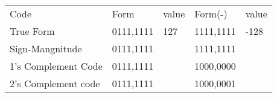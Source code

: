 \documentclass[en, 11pt, xcolor=dvipsnames]{beamer}
\begin{document}
\begin{frame}[fragile]


	\begin{columns}[c]
		\begin{column}{0.9\textwidth}

			\begin{table}
				\begin{tabular}{l l l l l}
					Code                & Form      & value & Form(-)   & value \\
					True Form           & 0111,1111 & 127   & 1111,1111 & -128  \\
					Sign-Mangnitude     & 0111,1111 &       & 1111,1111 &       \\
					1's Complement Code & 0111,1111 &       & 1000,0000 &       \\
					2's Complement code & 0111,1111 &       & 1000,0001 &       \\
				\end{tabular}
			\end{table}

		\end{column}
	\end{columns}

\end{frame}
\end{document}
